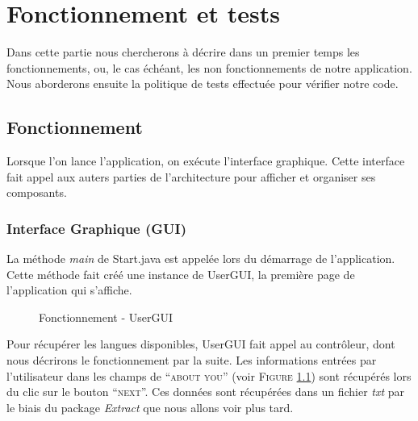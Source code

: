 \chapter{Fonctionnement et tests}

Dans cette partie nous chercherons à décrire dans un premier temps les fonctionnements, ou, le cas échéant, les non fonctionnements de notre application.  Nous aborderons ensuite la politique de tests effectuée pour vérifier notre code. 

\section{Fonctionnement}

Lorsque l'on lance l'application, on exécute l'interface graphique. Cette interface fait appel aux auters parties de l'architecture pour afficher et organiser ses composants.

\subsection{Interface Graphique (GUI)}

La méthode \textit{main} de Start.java est appelée lors du démarrage de l'application. Cette méthode fait créé une instance de UserGUI, la première page de l'application qui s'affiche.

\begin{figure}[!ht]
\begin{center}
  \caption{Fonctionnement - UserGUI}
  \label{UserGUI} 
\end{center}
\end{figure}

Pour récupérer les langues disponibles, UserGUI fait appel au contrôleur, dont nous décrirons le fonctionnement par la suite.
Les informations entrées par l'utilisateur dans les champs de ``\textsc{about you}'' (voir \textsc{Figure} \ref{UserGUI}) sont récupérés lors du clic sur le bouton ``\textsc{next}''. Ces données sont récupérées dans un fichier \textit{txt} par le biais du package \textit{Extract} que nous allons voir plus tard.

